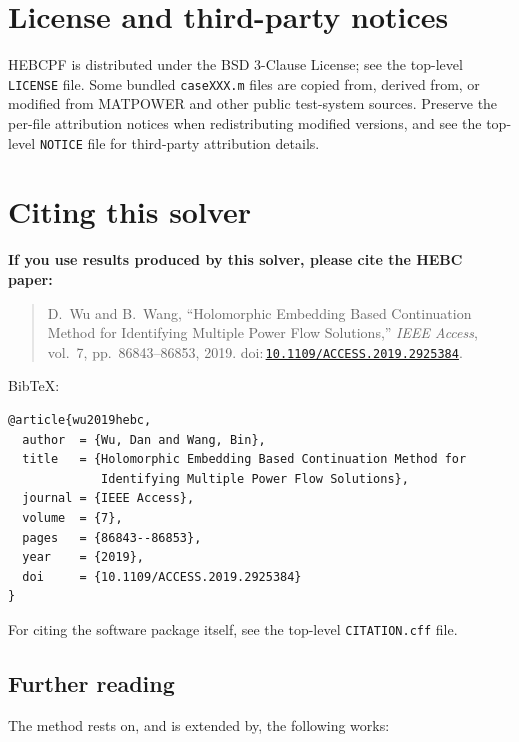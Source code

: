 \documentclass[11pt,a4paper]{article}
\newcommand{\doi}[1]{\href{https://doi.org/#1}{\nolinkurl{#1}}}
\newcommand{\code}[1]{\texttt{#1}}
\begin{document}
\section{License and third-party notices}

HEBCPF is distributed under the BSD 3-Clause License; see the top-level
\code{LICENSE} file. Some bundled \code{caseXXX.m} files are copied from, derived from,
or modified from MATPOWER and other public test-system sources. Preserve the per-file
attribution notices when redistributing modified versions, and see the top-level
\code{NOTICE} file for third-party attribution details.

\section{Citing this solver}\label{sec:cite}

\textbf{If you use results produced by this solver, please cite the HEBC paper:}
\begin{quote}
D.\ Wu and B.\ Wang, ``Holomorphic Embedding Based Continuation Method for Identifying
Multiple Power Flow Solutions,'' \emph{IEEE Access}, vol.~7, pp.~86843--86853, 2019.
doi:\,\doi{10.1109/ACCESS.2019.2925384}.
\end{quote}

BibTeX:
\begin{lstlisting}[style=sh]
@article{wu2019hebc,
  author  = {Wu, Dan and Wang, Bin},
  title   = {Holomorphic Embedding Based Continuation Method for
             Identifying Multiple Power Flow Solutions},
  journal = {IEEE Access},
  volume  = {7},
  pages   = {86843--86853},
  year    = {2019},
  doi     = {10.1109/ACCESS.2019.2925384}
}
\end{lstlisting}

For citing the software package itself, see the top-level \code{CITATION.cff} file.

\subsection*{Further reading}
The method rests on, and is extended by, the following works:
\end{document}
